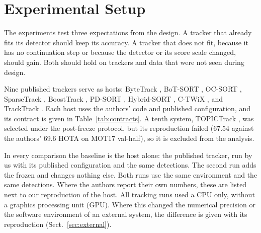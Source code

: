 \section{Experimental Setup}\label{sec:setup}

The experiments test three expectations from the design. A tracker that
already fits its detector should keep its accuracy. A tracker that does not
fit, because it has no continuation step or because the detector or its
score scale changed, should gain. Both should hold on trackers and data that
were not seen during design.

\label{sec:hosts}Nine published trackers serve as hosts: ByteTrack
\cite{zhang2022bytetrack}, BoT-SORT \cite{aharon2022botsort}, OC-SORT
\cite{cao2023ocsort}, SparseTrack \cite{liu2025sparsetrack}, BoostTrack
\cite{stanojevic2024boosttrack}, PD-SORT \cite{wang2025pdsort},
Hybrid-SORT \cite{yang2024hybridsort}, C-TWiX \cite{miah2025twix}, and
TrackTrack \cite{shim2025tracktrack}. Each host uses the authors' code and
published configuration, and its contract is given in
Table~\ref{tab:contracts}. A tenth system, TOPICTrack
\cite{cao2025topictrack}, was selected under the post-freeze protocol, but
its reproduction failed (67.54 against the authors' 69.6 HOTA on MOT17
val-half), so it is excluded from the analysis.

In every comparison the baseline is the host alone: the published tracker,
run by us with its published configuration and the same detections. The
second run adds the frozen \scl{} and changes nothing else. Both runs use the
same environment and the same detections. Where the authors report their own
numbers, these are listed next to our reproduction of the host. All tracking
runs used a CPU only, without a graphics processing unit (GPU).
Where this changed the numerical precision or the software environment of an
external system, the difference is given with its reproduction
(Sect.~\ref{sec:external}).
